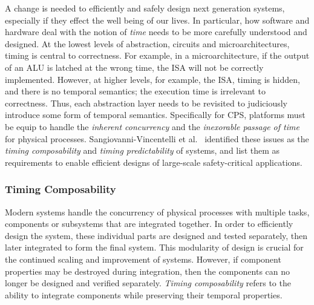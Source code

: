 A change is needed to efficiently and safely design next generation systems, especially if they effect the well being of our lives.
In particular, how software and hardware deal with the notion of \textit{time} needs to be more carefully understood and designed.
At the lowest levels of abstraction, circuits and microarchitectures, timing is central to correctness.
For example, in a microarchitecture, if the output of an ALU is latched at the wrong time, the ISA will not be correctly implemented.
However, at higher levels, for example, the ISA, timing is hidden, and there is no temporal semantics; the execution time is irrelevant to correctness. 
Thus, each abstraction layer needs to be revisited to judiciously introduce some form of temporal semantics. 
Specifically for CPS, platforms must be equip to handle the \emph{inherent concurrency} and the \emph{inexorable passage of time} for physical processes.   
Sangiovanni-Vincentelli et al.~\cite{Sangiovanni-Vincentelli2007automotive} identified these issues as the \textit{timing composability} and \textit{timing predictability} of systems, and list them as requirements to enable efficient designs of large-scale safety-critical applications.    

\subsubsection{Timing Composability}
Modern systems handle the concurrency of physical processes with multiple tasks, components or subsystems that are integrated together.    
In order to efficiently design the system, these individual parts are designed and tested separately, then later integrated to form the final system. 
This modularity of design is crucial for the continued scaling and improvement of systems.      
However, if component properties may be destroyed during integration, then the components can no longer be designed and verified separately. 
\textit{Timing composability} refers to the ability to integrate components while preserving their temporal properties.

